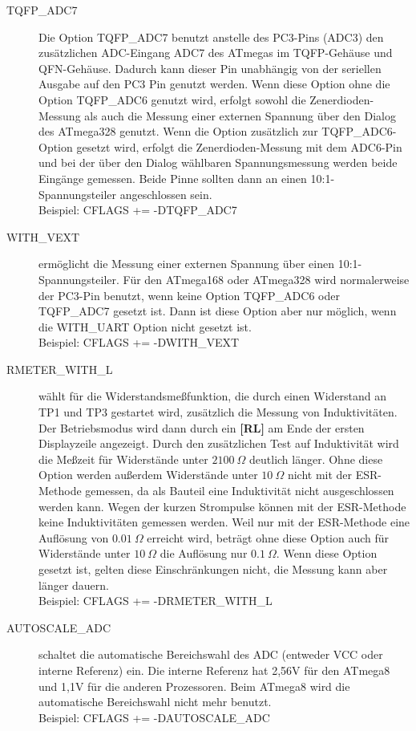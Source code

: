 \begin{description}
  \item[TQFP\_ADC7] Die Option TQFP\_ADC7 benutzt anstelle des PC3-Pins (ADC3) den zusätzlichen ADC-Eingang ADC7
des ATmegas im TQFP-Gehäuse und QFN-Gehäuse.
Dadurch kann dieser Pin unabhängig von der seriellen Ausgabe auf den PC3 Pin genutzt werden. Wenn diese Option 
ohne die Option TQFP\_ADC6 genutzt wird, erfolgt sowohl die Zenerdioden-Messung als auch die Messung einer externen
Spannung über den Dialog des ATmega328 genutzt. Wenn die Option zusätzlich zur TQFP\_ADC6-Option gesetzt wird,
erfolgt die Zenerdioden-Messung mit dem ADC6-Pin und bei der über den Dialog wählbaren Spannungsmessung werden
beide Eingänge gemessen. Beide Pinne sollten dann an einen 10:1-Spannungsteiler angeschlossen sein.\\
Beispiel: CFLAGS += -DTQFP\_ADC7

  \item[WITH\_VEXT] ermöglicht die Messung einer externen Spannung über einen 10:1-Spannungsteiler.
Für den ATmega168 oder ATmega328 wird normalerweise der PC3-Pin benutzt, wenn keine Option TQFP\_ADC6 oder
TQFP\_ADC7 gesetzt ist. Dann ist diese Option aber nur möglich, wenn die WITH\_UART Option nicht gesetzt ist.\\
Beispiel: CFLAGS += -DWITH\_VEXT 

  \item[RMETER\_WITH\_L] wählt für die Widerstandsmeßfunktion, die durch einen Widerstand an TP1 und TP3 gestartet wird,
zusätzlich die Messung von Induktivitäten. Der Betriebsmodus wird dann durch ein {\bf[RL]} am Ende der ersten Displayzeile
angezeigt. Durch den zusätzlichen Test auf Induktivität wird die Meßzeit für Widerstände unter \(2100~\Omega\) deutlich
länger. Ohne diese Option werden außerdem Widerstände unter \(10~\Omega\) nicht mit der ESR-Methode gemessen,
da als Bauteil eine Induktivität nicht ausgeschlossen werden kann.
Wegen der kurzen Strompulse können mit der ESR-Methode keine Induktivitäten gemessen werden.
Weil nur mit der ESR-Methode eine Auflösung von \(0.01~\Omega\) erreicht wird, beträgt ohne diese Option auch für 
Widerstände unter \(10~\Omega\) die Auflösung nur \(0.1~\Omega\).
Wenn diese Option gesetzt ist, gelten diese Einschränkungen nicht, die Messung kann aber länger dauern.\\
Beispiel: CFLAGS += -DRMETER\_WITH\_L

  \item[AUTOSCALE\_ADC] schaltet die automatische Bereichswahl des ADC (entweder VCC oder interne Referenz) ein.
Die interne Referenz hat 2,56V für den ATmega8 und 1,1V für die anderen Prozessoren.
Beim ATmega8 wird die automatische Bereichswahl nicht mehr benutzt.\\
Beispiel: CFLAGS += -DAUTOSCALE\_ADC


\end{description}
